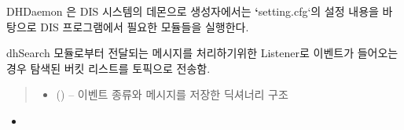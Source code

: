 \documentclass[a4paper,10pt,english]{sphinxmanual}
\begin{document}
\begin{fulllineitems}
\label{\detokenize{_DHDaemon:DHDaemon}}
\pysigstartsignatures
{}
\pysigstopsignatures
\sphinxAtStartPar
DHDaemon 은 DIS 시스템의 데몬으로 생성자에서는 {\color{red}\bfseries{}`}setting.cfg`의 설정 내용을 바탕으로 DIS 프로그램에서 필요한 모듈들을 실행한다.

\begin{fulllineitems}
\label{\detokenize{_DHDaemon:DHDaemon._dhSearchListener}}
\pysigstartsignatures
{}
\pysigstopsignatures
\sphinxAtStartPar
dhSearch 모듈로부터 전달되는 메시지를 처리하기위한 Listener로  이벤트가 들어오는 경우
탐색된 버킷 리스트를  토픽으로 전송함.
\begin{quote}\begin{description}
\begin{itemize}
\item {} 
\sphinxAtStartPar
{} () – 이벤트 종류와 메시지를 저장한 딕셔너리 구조

\end{itemize}

\end{description}\end{quote}


\nopagebreak

\begin{itemize}
\item {} 
\sphinxAtStartPar
{\hyperref[\detokenize{_DHSearch:DHSearch._dmUpdateBucketList}]{}}

\end{itemize}



\end{fulllineitems}



\end{fulllineitems}
\end{document}
